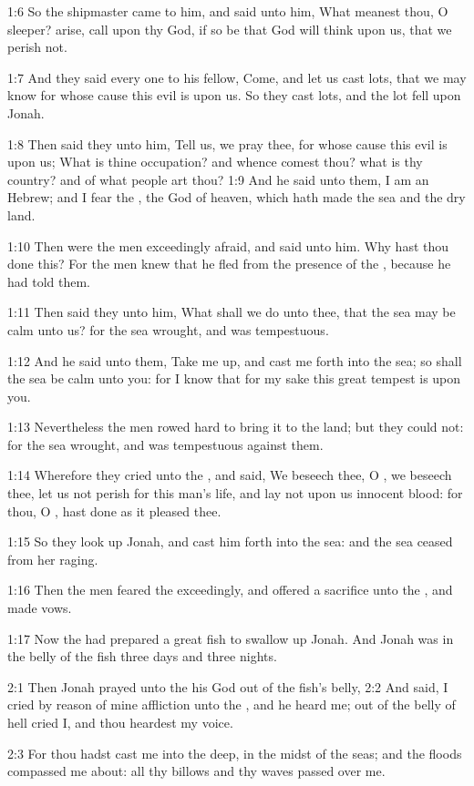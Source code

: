 1:6 So the shipmaster came to him, and said unto him, What meanest thou, O sleeper? arise, call upon thy God, if so be that God will think upon us, that we perish not.

1:7 And they said every one to his fellow, Come, and let us cast lots, that we may know for whose cause this evil is upon us. So they cast lots, and the lot fell upon Jonah.

1:8 Then said they unto him, Tell us, we pray thee, for whose cause this evil is upon us; What is thine occupation? and whence comest thou? what is thy country? and of what people art thou?  1:9 And he said unto them, I am an Hebrew; and I fear the \LORD, the God of heaven, which hath made the sea and the dry land.

1:10 Then were the men exceedingly afraid, and said unto him. Why hast thou done this? For the men knew that he fled from the presence of the \LORD, because he had told them.

1:11 Then said they unto him, What shall we do unto thee, that the sea may be calm unto us? for the sea wrought, and was tempestuous.

1:12 And he said unto them, Take me up, and cast me forth into the sea; so shall the sea be calm unto you: for I know that for my sake this great tempest is upon you.

1:13 Nevertheless the men rowed hard to bring it to the land; but they could not: for the sea wrought, and was tempestuous against them.

1:14 Wherefore they cried unto the \LORD, and said, We beseech thee, O \LORD, we beseech thee, let us not perish for this man's life, and lay not upon us innocent blood: for thou, O \LORD, hast done as it pleased thee.

1:15 So they look up Jonah, and cast him forth into the sea: and the sea ceased from her raging.

1:16 Then the men feared the \LORD exceedingly, and offered a sacrifice unto the \LORD, and made vows.

1:17 Now the \LORD had prepared a great fish to swallow up Jonah. And Jonah was in the belly of the fish three days and three nights.

2:1 Then Jonah prayed unto the \LORD his God out of the fish's belly, 2:2 And said, I cried by reason of mine affliction unto the \LORD, and he heard me; out of the belly of hell cried I, and thou heardest my voice.

2:3 For thou hadst cast me into the deep, in the midst of the seas; and the floods compassed me about: all thy billows and thy waves passed over me.

